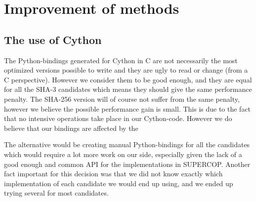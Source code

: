 \documentclass[english,12pt,a4paper]{book}
\begin{document}

%
%



%
%
%

\section{Improvement of methods}

\subsection{The use of Cython}


The Python-bindings generated for Cython in C are not necessarily the most
optimized versions possible to write and they are ugly to read or change (from
a C perspective). However we consider them to be good enough, and they are
equal for all the \ac{SHA}-3 candidates which means they should give the same
performance penalty. The \ac{SHA}-256 version will of course not suffer from
the same penalty, however we believe the possible performance gain is small.
This is due to the fact that no intensive operations take place in our
Cython-code. However we do believe that our bindings are affected by the 

The alternative would be creating manual Python-bindings for all the candidates
which would require a lot more work on our side, especially given the lack of a
good enough and common \ac{API} for the implementations in \ac{SUPERCOP}.
Another fact important for this decision was that we did not know exactly which
implementation of each candidate we would end up using, and we ended up trying
several for most candidates.
\end{document}
